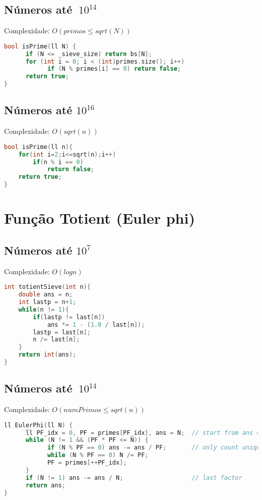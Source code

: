 \documentclass[12pt,a4paper,twoside]{report}
\begin{document}
\subsection{Números até $~10^{14}$}
Complexidade: $O(primos \le sqrt(N))$
\noindent\begin{lstlisting}[caption=Teste de primalidade,language=C++]
bool isPrime(ll N) {                
      if (N <= _sieve_size) return bs[N];
      for (int i = 0; i < (int)primes.size(); i++)
            if (N % primes[i] == 0) return false;
      return true;                    
}
\end{lstlisting}

\subsection{Números até $10^{16}$}
Complexidade: $O(sqrt(n))$
\noindent\begin{lstlisting}[caption=Teste de primalidade para números grandes,language=C++]
bool isPrime(ll n){
    for(int i=2;i<=sqrt(n);i++)
        if(n % i == 0)
            return false;
    return true;
}
\end{lstlisting}


\section{Função Totient (Euler phi)}
\subsection{Números até $10^7$}
Complexidade: $O(log n)$
\noindent\begin{lstlisting}[caption=Totient usando crivo,language=C++]
int totientSieve(int n){
    double ans = n;
    int lastp = n+1;
    while(n != 1){
        if(lastp != last[n])
            ans *= 1 - (1.0 / last[n]);
        lastp = last[n];
        n /= last[n];
    }
    return int(ans);
}
\end{lstlisting}

\subsection{Números até $~10^{14}$}
Complexidade: $O(numPrimos \le sqrt(n))$
\noindent\begin{lstlisting}[caption=Totient usando crivo para números grandes,language=C++]
ll EulerPhi(ll N) {
      ll PF_idx = 0, PF = primes[PF_idx], ans = N;  // start from ans = N
      while (N != 1 && (PF * PF <= N)) {
            if (N % PF == 0) ans -= ans / PF;       // only count unique factor
            while (N % PF == 0) N /= PF;
            PF = primes[++PF_idx];
      }
      if (N != 1) ans -= ans / N;                   // last factor
      return ans;
}
\end{lstlisting}
\end{document}
